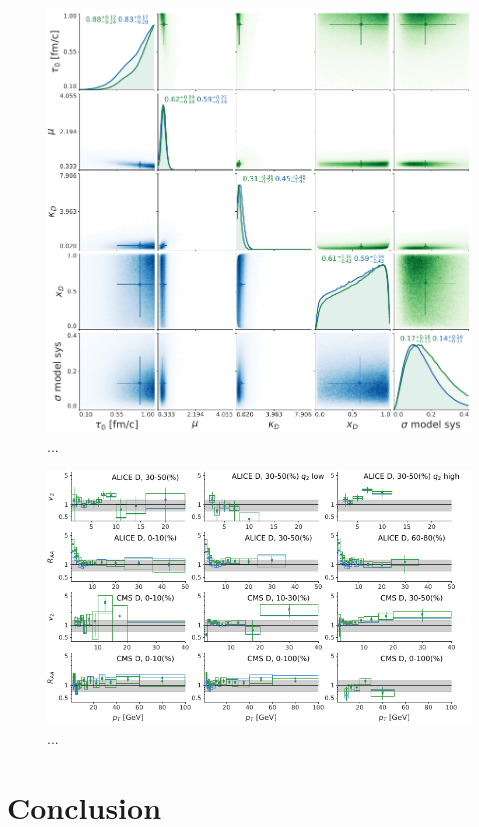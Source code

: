 \documentclass[aps, prc, reprint, amsmath, groupedaddress, nofootinbib]{revtex4-1}
\begin{document}
\begin{figure}
\includegraphics[width=\textwidth]{posterior.pdf}
\caption{...}\label{plots:posterior}
\end{figure}
\begin{figure}
\includegraphics[width=\textwidth]{find_map.pdf}
\caption{...}\label{plots:posterior}
\end{figure}

\section{Conclusion}\label{section:conclusion}
\end{document}
